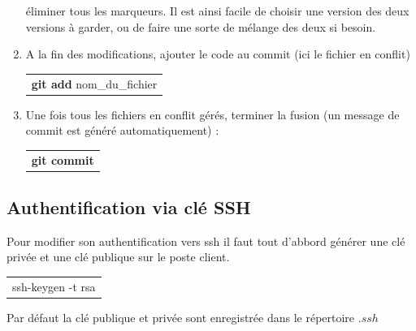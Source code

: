 \documentclass[a4paper,10pt]{article}
\begin{document}
\begin{spacing}{1.5}
\begin{enumerate}
éliminer tous les marqueurs. Il est ainsi facile de choisir une version des deux
versions à garder, ou de faire une sorte de mélange des deux si besoin.
\item A la fin des modifications, ajouter le code au commit (ici le fichier en conflit)
\begin{center}
  \begin{tabular}{c}
    \rowcolor{lightgray!50!white}
      \textbf{git add} nom\_du\_fichier
  \end{tabular}
\end{center}
\item Une fois tous les fichiers en conflit gérés, terminer la fusion (un message de commit est généré automatiquement) :
\begin{center}
  \begin{tabular}{c}
    \rowcolor{lightgray!50!white}
      \textbf{git commit}
  \end{tabular}
\end{center}
\end{enumerate}

\subsection*{Authentification via clé SSH}
Pour modifier son authentification vers ssh il faut tout d'abbord générer une
clé privée et une clé publique sur le poste client.
\begin{center}
  \begin{tabular}{c}
    \rowcolor{lightgray!50!white}
      ssh-keygen -t rsa
  \end{tabular}
\end{center}
Par défaut la clé publique et privée sont enregistrée dans le répertoire $.ssh$


\newpage
\end{spacing}
\end{document}
